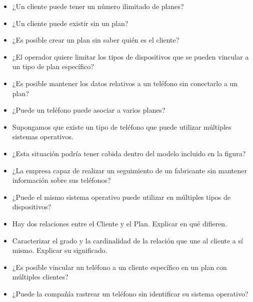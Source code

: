 \documentclass[12pt, letterpaper]{article}
\begin{document}
    \begin{itemize}
          \item ¿Un cliente puede tener un número ilimitado de planes?
          \item ¿Un cliente puede existir sin un plan?
          \item ¿Es posible crear un plan sin saber quién es el cliente?
          \item ¿El operador quiere limitar los tipos de dispositivos que se 
                pueden vincular a un tipo de plan específico?
          \item ¿Es posible mantener los datos relativos a un teléfono sin 
                conectarlo a un plan?
          \item ¿Puede un teléfono puede asociar a varios planes?
          \item Supongamos que existe un tipo de teléfono que puede utilizar múltiples sistemas operativos.
          \item[] ¿Esta situación podría tener cabida dentro del modelo incluido en la figura?
          \item ¿La empresa capaz de realizar un seguimiento de un fabricante sin mantener información sobre
                  sus teléfonos?
          \item ¿Puede el mismo sistema operativo puede utilizar en múltiples tipos de dispositivos?
          \item Hay dos relaciones entre el Cliente y el Plan. Explicar en qué difieren.
          \item Caracterizar el grado y la cardinalidad de la relación que une al cliente a sí mismo. Explicar su
                  significado.
          \item ¿Es posible vincular un teléfono a un cliente específico en un plan con múltiples clientes?
          \item ¿Puede la compañía rastrear un teléfono sin identificar su sistema operativo?
    \end{itemize}
\end{document}
